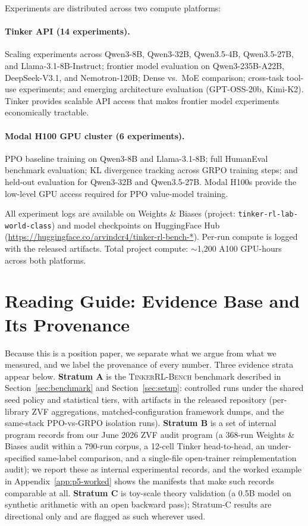 \documentclass{article}  \usepackage[preprint,nonatbib]{neurips_2026} \usepackage[numbers]{natbib}
\newcommand{\ours}{\textsc{TinkerRL-Bench}}
\providecommand{\secref}[1]{Section~\ref{#1}}
\begin{document}
Experiments are distributed across two compute platforms:

\paragraph{Tinker API (14 experiments).}
Scaling experiments across Qwen3-8B, Qwen3-32B, Qwen3.5-4B, Qwen3.5-27B,
and Llama-3.1-8B-Instruct; frontier model evaluation on Qwen3-235B-A22B,
DeepSeek-V3.1, and Nemotron-120B; Dense vs.~MoE comparison; cross-task
tool-use experiments; and emerging architecture evaluation (GPT-OSS-20b,
Kimi-K2). Tinker provides scalable API access that makes frontier model
experiments economically tractable.

\paragraph{Modal H100 GPU cluster (6 experiments).}
PPO baseline training on Qwen3-8B and Llama-3.1-8B; full HumanEval
benchmark evaluation; KL divergence tracking across GRPO training steps;
and held-out evaluation for Qwen3-32B and Qwen3.5-27B. Modal H100s
provide the low-level GPU access required for PPO value-model training.

All experiment logs are available on Weights \& Biases (project:
\texttt{tinker-rl-lab-world-class}) and model checkpoints on HuggingFace
Hub (\url{https://huggingface.co/arvindcr4/tinker-rl-bench-*}).
Per-run compute is logged with the released artifacts. Total project compute:
$\sim$1,200 A100 GPU-hours across both platforms.

 \section{Reading Guide: Evidence Base and Its Provenance}
\label{sec:p5-results}
Because this is a position paper, we separate what we argue from what we
measured, and we label the provenance of every number. Three evidence strata
appear below. \textbf{Stratum A} is the \ours{} benchmark described in
\secref{sec:benchmark} and \secref{sec:setup}: controlled runs under the shared
seed policy and statistical tiers, with artifacts in the released repository
(per-library ZVF aggregations, matched-configuration framework dumps, and the
same-stack PPO-vs-GRPO isolation runs). \textbf{Stratum B} is a set of internal
program records from our June 2026 ZVF audit program (a 368-run Weights \&
Biases audit within a 790-run corpus, a 12-cell Tinker head-to-head, an
under-specified same-label comparison, and a single-file open-trainer reimplementation audit); we
report these as internal experimental records, and the worked example in
Appendix~\ref{app:p5-worked} shows the manifests that make such records
comparable at all. \textbf{Stratum C} is toy-scale theory validation (a 0.5B
model on synthetic arithmetic with an open backward pass); Stratum-C results are
directional only and are flagged as such wherever used.
\end{document}
